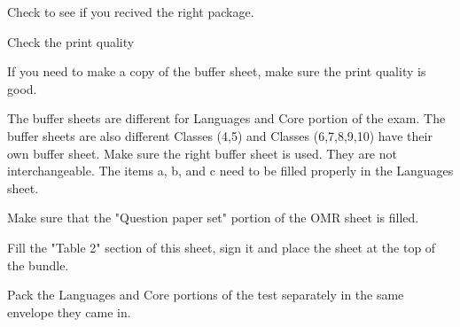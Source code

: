 \subject {Before the test}
\startitemize[n,packed]
  \item Check to see if you recived the right package.
  \item Check the print quality
  \item If you need to make a copy of the buffer sheet, make sure the print quality is good.
  \item The buffer sheets are different for {\bi Languages} and {\bi Core} portion of the exam. The buffer sheets are also different
  {\bi Classes (4,5)} and {\bi Classes (6,7,8,9,10)} have their own buffer sheet. Make sure the right buffer sheet is used.
  They are not interchangeable. The items {\bi a}, {\bi b}, and {\bi c} need to be filled properly in the {\bi Languages} sheet.
\stopitemize
\subject {During the test}
\startitemize
  \item \symbol[BigSquare] {\tfc \blacksquare} \symbol[BigSquare]
\subject{After the test}
\startitemize[1,packed]
  \item Make sure that the "Question paper set" portion of the OMR sheet is filled.
  \item Fill the "Table 2" section of this sheet, sign it and place the sheet at the top of the bundle.
  \item Pack the {\bi Languages} and {\bi Core} portions of the test separately in the same envelope they came in.
\stopitemize
